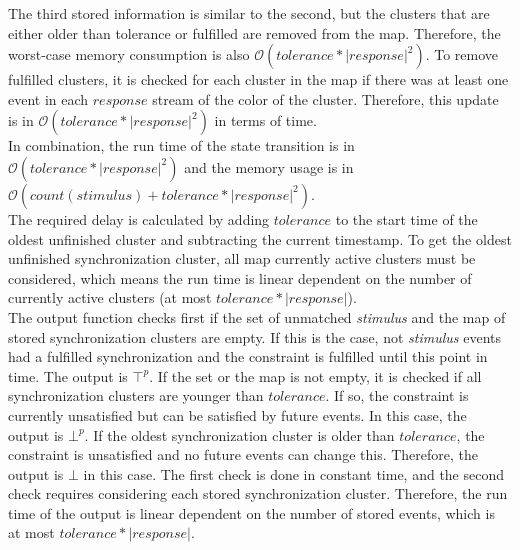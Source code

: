 	The third stored information is similar to the second, but the clusters that are either older than tolerance or fulfilled are removed from the map. Therefore, the worst-case memory consumption is also $\mathcal{O}(tolerance*|response|^2)$. To remove fulfilled clusters, it is checked for each cluster in the map if there was at least one event in each $response$ stream of the color of the cluster. Therefore, this update is in $\mathcal{O}(tolerance*|response|^2)$ in terms of time.\\
	In combination, the run time of the state transition is in $\mathcal{O}(tolerance*|response|^2)$ and the memory usage is in $\mathcal O(count(stimulus) + tolerance*|response|^2)$.\\
	The required delay is calculated by adding $tolerance$ to the start time of the oldest unfinished cluster and subtracting the current timestamp. To get the oldest unfinished synchronization cluster, all map currently active clusters must be considered, which means the run time is linear dependent on the number of currently active clusters (at most $tolerance*|response|$).\\
	The output function checks first if the set of unmatched \textit{stimulus} and the map of stored synchronization clusters are empty. If this is the case, not \textit{stimulus} events had a fulfilled synchronization and the constraint is fulfilled until this point in time. The output is $\top^p$. If the set or the map is not empty, it is checked if all synchronization clusters are younger than $tolerance$. If so, the constraint is currently unsatisfied but can be satisfied by future events. In this case, the output is $\bot^p$. If the oldest synchronization cluster is older than $tolerance$, the constraint is unsatisfied and no future events can change this. Therefore, the output is $\bot$ in this case. The first check is done in constant time, and the second check requires considering each stored synchronization cluster. Therefore, the run time of the output is linear dependent on the number of stored events, which is at most $tolerance*|response|$.
	
